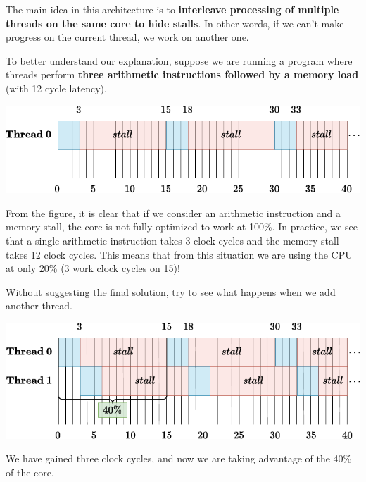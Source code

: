 \highspace
The main idea in this architecture is to \textbf{interleave processing of multiple threads on the same core to hide stalls}. In other words, if we can't make progress on the current thread, we work on another one.

\begin{examplebox}\label{example: core utilization}
    To better understand our explanation, suppose we are running a program where threads perform \textbf{three arithmetic instructions followed by a memory load} (with 12 cycle latency).
    \begin{center}
        \includegraphics[width=\textwidth]{img/multi-threading-1.pdf}
    \end{center}

    From the figure, it is clear that if we consider an arithmetic instruction and a memory stall, the core is not fully optimized to work at 100\%. In practice, we see that a single arithmetic instruction takes 3 clock cycles and the memory stall takes 12 clock cycles. This means that from this situation we are using the CPU at only 20\% (3 work clock cycles on 15)!

    Without suggesting the final solution, try to see what happens when we add another thread.
    \begin{center}
        \includegraphics[width=\textwidth]{img/multi-threading-2.pdf}
    \end{center}
    
    We have gained three clock cycles, and now we are taking advantage of the 40\% of the core.


\end{examplebox}
